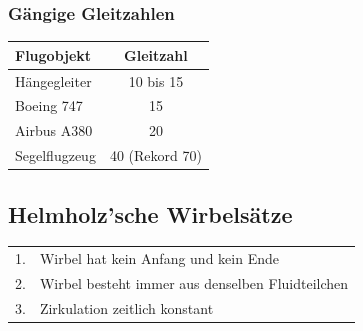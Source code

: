 \subsubsection{Gängige Gleitzahlen}
\begin{center}
    \begin{tabular}{lc}
        \textbf{Flugobjekt} & \textbf{Gleitzahl}\\ \hline
		Hängegleiter  & 10 bis 15 \\
		Boeing 747    & 15 \\
		Airbus A380   & 20 \\
		Segelflugzeug &	40 (Rekord 70) \\
	\end{tabular}
\end{center}


\subsection{Helmholz'sche Wirbelsätze}
\begin{tabular}{ll}
1. & Wirbel hat kein Anfang und kein Ende \\
2. & Wirbel besteht immer aus denselben Fluidteilchen \\
3. & Zirkulation zeitlich konstant \\
\end{tabular}


